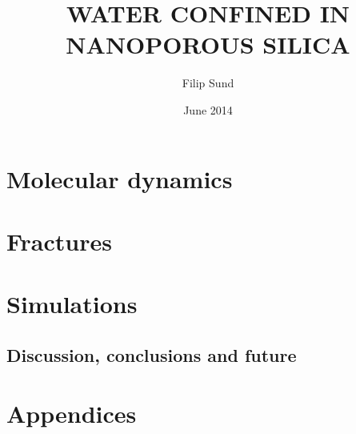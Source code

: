 \documentclass[twoside,english,a4paper,12pt]{uiofysmaster}
\author{Filip Sund}
\title{\uppercase{Water confined in\\ nanoporous silica}}
\date{June 2014}
\begin{document}

\cleardoublepage


% 


\tableofcontents



\part{Molecular dynamics}
    
%     
    
    
    
    

\part{Fractures}
    
    
    
    
    

\part{Simulations}
    
    
    
    
    \FloatBarrier
    
    

    \chapter{Discussion, conclusions and future}
    
    
%     

\part{Appendices}
\begin{appendix}
    
    
\end{appendix}

\listoffigures
\listoftables
\listoflistings
\printbibliography

\listoftodos
\end{document}
